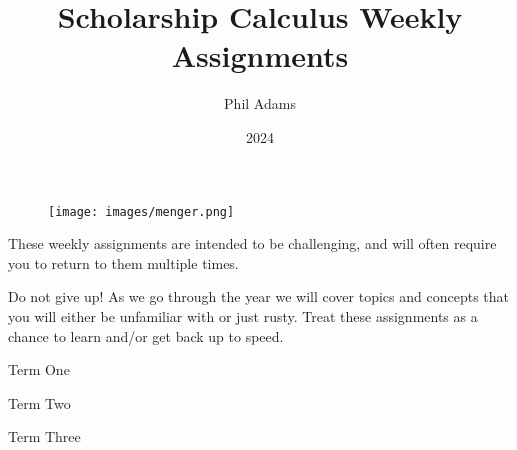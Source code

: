 \documentclass[12pt, letterpaper]{article}
\title{Scholarship Calculus Weekly Assignments}
\author{Phil Adams}
\date{2024}
\begin{document}
\maketitle

\begin{figure}[H]
    \centering
    \texttt{[image: images/menger.png]}
\end{figure}

\setlength{\parskip}{15pt}

These weekly assignments are intended to be challenging, and will often require you to return to them multiple times.

Do not give up! As we go through the year we will cover topics and concepts that you will either be unfamiliar with or just rusty. Treat these assignments as a chance to learn and/or get back up to speed.

\pagebreak
\begin{center}
    \huge
    Term One
    \normalsize
\end{center}
\restoregeometry

\pagebreak

\pagebreak

\pagebreak

\pagebreak

\pagebreak

\pagebreak

\pagebreak

\pagebreak

\pagebreak


\pagebreak
\begin{center}
    \huge
    Term Two
    \normalsize
\end{center}
\restoregeometry

\pagebreak

\pagebreak

\pagebreak

\pagebreak

\pagebreak

\pagebreak

\pagebreak

\pagebreak


\pagebreak
\begin{center}
    \huge
    Term Three
    \normalsize
\end{center}
\restoregeometry

\pagebreak

\end{document}
